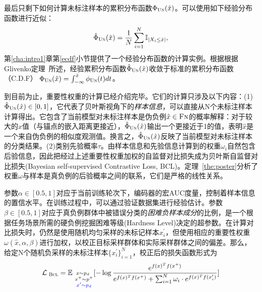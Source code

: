 最后只剩下如何计算未标注样本的累积分布函数$\Phi_{\textsc{Un}}(\hat{x})$。可以使用如下经验分布函数进行近似：
\begin{equation}\label{eq:puedf}
	\hat \Phi_{\textsc{Un}} (\hat{x}) = \frac{1}{N} \sum_{i=1}^{N}\mathbb{I}_{|X_i \leq \hat{x}|},
\end{equation}
第\ref{cha:intro1}章第\ref{ecdf}小节提供了一个经验分布函数的计算实例。根据根据Glivenko定理~\cite{glivenko:1933}所述，经验累积分布函数$\hat{\Phi}_{\textsc{Un}}(\hat{x})$收敛于标准的累积分布函数（C.D.F） $\Phi_{\textsc{Un}}(\hat{x}) = \int_{-\infty}^{\hat{x}} \phi_{\textsc{Un}}(t)dt$。


到目前为止，重要性权重的计算已经介绍完毕。它们的计算只涉及以下内容：(1) $\hat{\Phi}_{\textsc{Un}} (\hat{x}) \in [0,1]$，它代表了贝叶斯视角下的\textit{样本信息}，可以直接从N个未标注样本计算得出。它包含了当前模型对未标注样本是伪负例$\hat x \in \textsc{Fn}$的概率解释：对于较大的$\hat{x}$值（与锚点的嵌入距离更接近），$\hat{\Phi}_{\textsc{Un}} (\hat{x})$输出一个更接近于1的值，表明$\hat{x}$是一个来自伪负例的相似度观测值。换言之，$\hat{\Phi}_{\textsc{Un}} (\hat{x})$反映了当前模型对未标注样本的分类结果。(2)类别先验概率$\tau$。由样本信息和先验信息计算到的权重$\omega_i$自然包含后验信息，因此把经过上述重要性权重加权的自监督对比损失成为贝叶斯自监督对比损失(Bayesian self-supervised Contrastive Loss, BCL)。定理~\ref{the:poster}分析了权重$\omega$与样本是真负例的后验概率之间的联系，它们是严格的线性关系。


参数$\alpha\in [0.5,1]$对应于当前训练轮次下，编码器的宏AUC度量，控制着样本信息的置信水平。在训练过程中，可以通过验证数据集进行经验估计。参数$\beta\in [0.5,1]$对应于真负例群体中被错误分类的\textit{困难负样本成分}的比例，是一个根据任务场景所需的硬负例挖掘困难等级(Hardness Level)决定的超参数。在计算对比损失时，仍然是使用随机均匀采样的未标记样本$x_i^\prime$，但使用相应的重要性权重$\omega(\hat{x},\alpha, \beta)$进行加权，以校正目标采样群体和实际采样群体之间的偏差。那么，给定N个随机负采样的未标注样本$\{x_i^\prime\}_{i=1}^N$，校正后的损失函数形式为
\begin{eqnarray}\label{eq:bcl}
	\mathcal{L}_\textsc{~Bcl}=  \mathbb E_{\substack{x \sim p_d\\~x^+ \sim p^+\\\color{blue}{~x^\prime \sim p_d}}} [-\log \frac{e^{f(x)^Tf(x^+)}}{e^{f(x)^Tf(x^+)} +  \sum_{i=1}^N  \omega_i \cdot e^{f(x)^Tf(x^\prime_i)} }]
\end{eqnarray}

